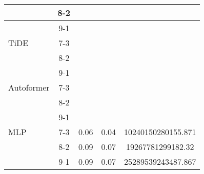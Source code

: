 \begin{table}[h!]
\begin{tabular}{|l|c|c|c|c|}
    \rowcolor{white}  & 8-2 &  &  &  \\ \hline
    \rowcolor{white}  & 9-1 &  &  &  \\ \hline
    \rowcolor{green!30} TiDE & 7-3 &  &  &  \\ \hline
    \rowcolor{green!30}  & 8-2 &  &  &  \\ \hline
    \rowcolor{green!30}  & 9-1 &  &  &  \\ \hline
    \rowcolor{white} Autoformer & 7-3 &  &  &  \\ \hline
    \rowcolor{white}  & 8-2 &  &  &  \\ \hline
    \rowcolor{white}  & 9-1 &  &  &  \\ \hline
    \rowcolor{white} MLP & 7-3 & 0.06 & 0.04& 10240150280155.871 \\ \hline
    \rowcolor{white}  & 8-2 & 0.09 & 0.07 & 19267781299182.32 \\ \hline
    \rowcolor{white}  & 9-1 & 0.09 & 0.07& 25289539243487.867  \\ \hline
    \end{tabular}
    \end{table}